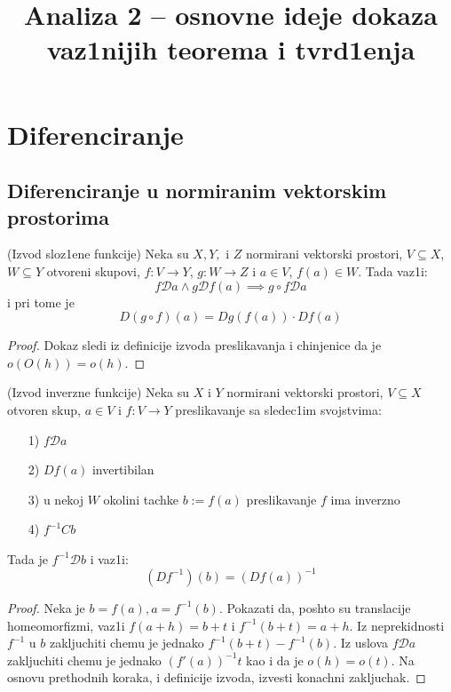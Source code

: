 \documentclass[a4paper,12pt]{article}
\title{\textbf{Analiza 2 -- osnovne ideje dokaza vaz1nijih teorema i tvrd1enja }}
\date{}
\newcommand{\psj}{\subseteq}
\begin{document}
\maketitle

\section{Diferenciranje}
\subsection{Diferenciranje u normiranim vektorskim prostorima}

\begin{tma}(Izvod sloz1ene funkcije)
Neka su $X, Y,$ i $Z$ normirani vektorski prostori, $V \psj X$, $W \psj Y$ otvoreni skupovi, $f: V \to Y$, $g: W \to Z$ i $a \in V$, $f(a) \in W$. Tada vaz1i:
\[f\mathcal{D} a \wedge g \mathcal{D} f(a) \implies g\circ f \mathcal{D} a\]
i pri tome je
\[D(g \circ f) (a) = Dg(f(a))\cdot Df(a) \]
\end{tma}
\begin{proof}
Dokaz sledi iz definicije izvoda preslikavanja i chinjenice da je $o(O(h)) = o(h)$.
\end{proof}

\begin{tma}(Izvod inverzne funkcije)
Neka su $X$ i $Y$ normirani vektorski prostori, $V \psj X$ otvoren skup, $a\in V$ i $f: V \to Y$ preslikavanje sa sledec1im svojstvima:
\begin{itemize}
\item[1)] $f \mathcal{D} a$
\item[2)] $Df(a)$ invertibilan
\item[3)] u nekoj $W$ okolini tachke $b := f(a)$ preslikavanje $f$ ima inverzno
\item[4)] $f^{-1} C b$
\end{itemize}
Tada je $f^{-1} \mathcal{D} b$ i vaz1i:
\[(Df^{-1})(b) = {(Df(a))}^{-1}\]
\end{tma}
\begin{proof}
Neka je $b = f(a), a = f^{-1}(b)$. Pokazati da, poshto su translacije homeomorfizmi, vaz1i $f(a+h) = b+t$ i $f^{-1}(b+t) = a+h$. Iz neprekidnosti $f^{-1}$ u $b$ zakljuchiti chemu je jednako $f^{-1} (b+t) - f^{-1}(b)$. Iz uslova $f \mathcal{D} a$ zakljuchiti chemu je jednako ${(f'(a))}^{-1} t$ kao i da je $o(h) = o(t)$. Na osnovu prethodnih koraka, i definicije izvoda, izvesti konachni zakljuchak.
\end{proof}
\end{document}
